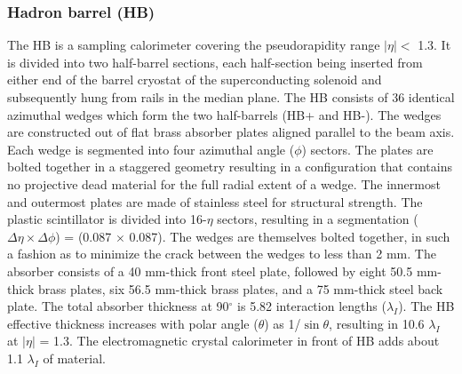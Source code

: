 \subsubsection{Hadron barrel (HB)}
The HB is a sampling calorimeter covering the pseudorapidity range $|\eta| <$ 1.3. It is divided into two half-barrel sections, each half-section being inserted from either end of the barrel cryostat of the superconducting solenoid and subsequently hung from rails in the median plane. The HB consists of 36 identical azimuthal wedges which form the two half-barrels (HB+ and HB-). The wedges are constructed out of flat brass absorber plates aligned parallel to the beam axis. Each wedge is segmented into four azimuthal angle ($\phi$) sectors. The plates are bolted together in a staggered geometry resulting in a configuration that contains no projective dead material for the full radial extent of a wedge. The innermost and outermost plates are made of stainless steel for structural strength. The plastic scintillator is divided into 16-$\eta$ sectors, resulting in a segmentation ($\Delta \eta \times \Delta \phi$) = (0.087 $\times$ 0.087). The wedges are themselves bolted together, in such a fashion as to minimize the crack between the wedges to less than 2 mm. The absorber consists of a 40 mm-thick front steel plate, followed by eight 50.5 mm-thick brass plates, six 56.5 mm-thick brass plates, and a 75 mm-thick steel back plate. The total absorber thickness at 90$^\circ$ is 5.82 interaction lengths ($\lambda_{I}$). The HB effective thickness increases with polar angle ($\theta$) as 1/$\sin \theta$, resulting in 10.6 $\lambda_{I}$ at $|\eta|$ = 1.3. The electromagnetic crystal calorimeter in front of HB adds about 1.1 $\lambda_{I}$ of material.

